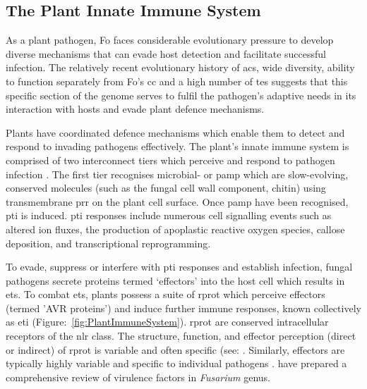 \subsection{The Plant Innate Immune System}

As a plant pathogen, \ac{Fo} faces considerable evolutionary pressure to develop diverse mechanisms that can evade host detection and facilitate successful infection. The relatively recent evolutionary history of \acp{ac}, wide diversity, ability to function separately from \ac{Fo}'s \ac{cc} and a high number of \acp{te} suggests that this specific section of the genome serves to fulfil the pathogen's adaptive needs in its interaction with hosts and evade plant defence mechanisms.

Plants have coordinated defence mechanisms which enable them to detect and respond to invading pathogens effectively. The plant’s innate immune system is comprised of two interconnect tiers which perceive and respond to pathogen infection \parencite{Jones2006, Han2019, DeFalco2021}. The first tier recognises microbial- or \ac{pamp} which are slow-evolving, conserved molecules (such as the fungal cell wall component, chitin) using transmembrane \ac{prr} on the plant cell surface. Once \ac{pamp} have been recognised, \ac{pti} is induced. \Ac{pti} responses include numerous cell signalling events such as altered ion fluxes, the production of apoplastic reactive oxygen species, callose deposition, and transcriptional reprogramming. 

To evade, suppress or interfere with \ac{pti} responses and establish infection, fungal pathogens secrete proteins termed ‘effectors’ into the host cell which results in \ac{ets}. To combat \ac{ets}, plants possess a suite of \ac{rprot} which perceive effectors (termed '\ac{AVR} proteins') and induce further immune responses, known collectively as \ac{eti} \parencite{Jones2006} (Figure:~\ref{fig:PlantImmuneSystem}). \Ac{rprot} are conserved intracellular receptors of the \ac{nlr} class. The structure, function, and effector perception (direct or indirect) of \ac{rprot} is variable and often specific (see: \textcite{Chen2022, Wang2022}. Similarly, effectors are typically highly variable and specific to individual pathogens \parencite{LoPresti2015}. \textcite{Gutierrez2023} have prepared a comprehensive review of virulence factors in \textit{Fusarium} genus. 

